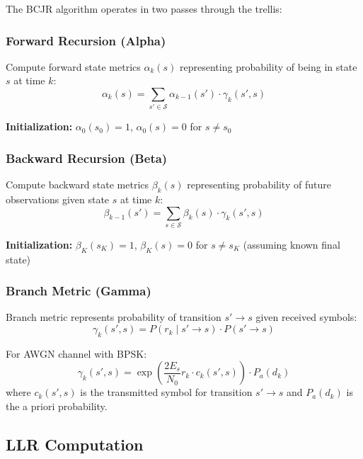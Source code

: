 The BCJR algorithm operates in two passes through the trellis:

\subsubsection{Forward Recursion (Alpha)}

Compute forward state metrics $\alpha_k(s)$ representing probability of being in state $s$ at time $k$:
\begin{equation}
\alpha_k(s) = \sum_{s' \in \mathcal{S}} \alpha_{k-1}(s') \cdot \gamma_k(s', s)
\label{eq:alpha-recursion}
\end{equation}

\textbf{Initialization:} $\alpha_0(s_0) = 1$, $\alpha_0(s) = 0$ for $s \neq s_0$

\subsubsection{Backward Recursion (Beta)}

Compute backward state metrics $\beta_k(s)$ representing probability of future observations given state $s$ at time $k$:
\begin{equation}
\beta_{k-1}(s') = \sum_{s \in \mathcal{S}} \beta_k(s) \cdot \gamma_k(s', s)
\label{eq:beta-recursion}
\end{equation}

\textbf{Initialization:} $\beta_K(s_K) = 1$, $\beta_K(s) = 0$ for $s \neq s_K$ (assuming known final state)

\subsubsection{Branch Metric (Gamma)}

Branch metric represents probability of transition $s' \rightarrow s$ given received symbols:
\begin{equation}
\gamma_k(s', s) = P(r_k \mid s' \rightarrow s) \cdot P(s' \rightarrow s)
\label{eq:gamma-metric}
\end{equation}

For AWGN channel with BPSK:
\begin{equation}
\gamma_k(s', s) = \exp\left(\frac{2 E_s}{N_0} r_k \cdot c_k(s', s)\right) \cdot P_a(d_k)
\end{equation}
where $c_k(s', s)$ is the transmitted symbol for transition $s' \rightarrow s$ and $P_a(d_k)$ is the a priori probability.

\subsection{LLR Computation}

